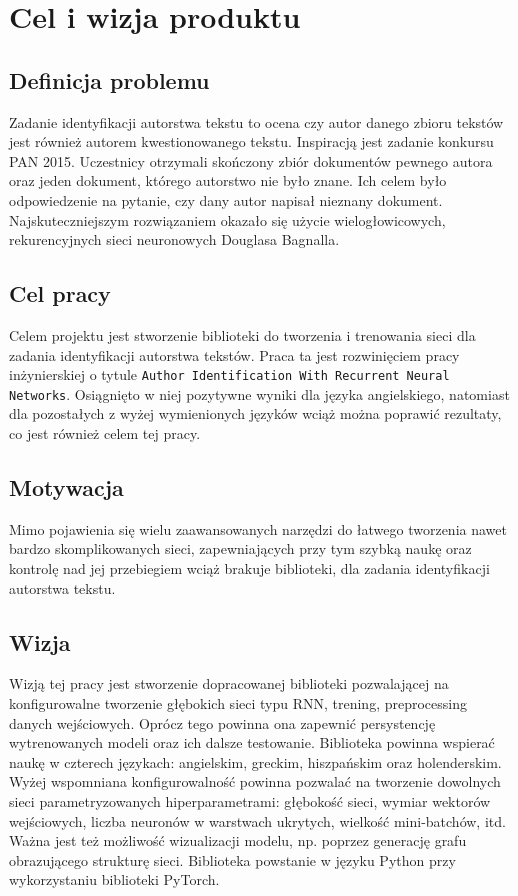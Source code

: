 \newpage
\section{Cel i wizja produktu}

\subsection{Definicja problemu}
Zadanie identyfikacji autorstwa tekstu to ocena czy autor danego zbioru tekstów jest również 
autorem kwestionowanego tekstu. Inspiracją jest zadanie konkursu PAN 2015. Uczestnicy otrzymali 
skończony zbiór dokumentów pewnego autora oraz jeden dokument, którego autorstwo nie było znane.
Ich celem było odpowiedzenie na pytanie, czy dany autor napisał nieznany dokument.
Najskuteczniejszym rozwiązaniem okazało się użycie wielogłowicowych, rekurencyjnych sieci 
neuronowych Douglasa Bagnalla.

 
\subsection{Cel pracy}
Celem projektu jest stworzenie biblioteki do tworzenia i trenowania sieci dla zadania 
identyfikacji autorstwa tekstów. Praca ta jest rozwinięciem pracy inżynierskiej o tytule 
\texttt{Author Identification With Recurrent Neural Networks}. Osiągnięto w niej pozytywne wyniki dla języka 
angielskiego, natomiast dla pozostałych z wyżej wymienionych języków wciąż można poprawić rezultaty,
co jest również celem tej pracy.


\subsection{Motywacja}
Mimo pojawienia się wielu zaawansowanych narzędzi do łatwego tworzenia nawet bardzo skomplikowanych sieci, 
zapewniających przy tym szybką naukę oraz kontrolę nad jej przebiegiem wciąż brakuje biblioteki, dla zadania identyfikacji autorstwa 
tekstu.

\subsection{Wizja}
Wizją tej pracy jest stworzenie dopracowanej biblioteki pozwalającej na konfigurowalne tworzenie 
głębokich sieci typu RNN, trening, preprocessing danych wejściowych. Oprócz tego powinna ona 
zapewnić persystencję wytrenowanych modeli oraz ich dalsze testowanie. Biblioteka powinna wspierać 
naukę w czterech językach: angielskim, greckim, hiszpańskim oraz holenderskim. Wyżej wspomniana konfigurowalność powinna 
pozwalać na tworzenie dowolnych sieci parametryzowanych hiperparametrami: głębokość sieci, wymiar 
wektorów wejściowych, liczba neuronów w warstwach ukrytych, wielkość mini-batchów, itd. Ważna jest 
też możliwość wizualizacji modelu, np. poprzez generację grafu obrazującego strukturę sieci. 
Biblioteka powstanie w języku Python przy wykorzystaniu biblioteki PyTorch.
 
